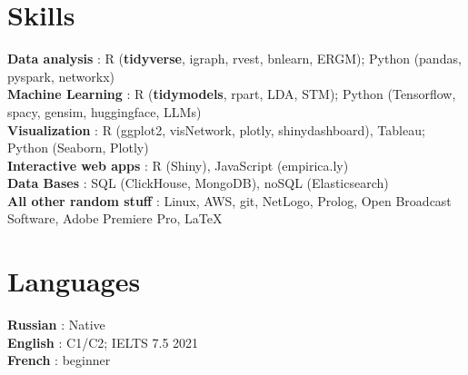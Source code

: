 \documentclass[letterpaper,11pt]{article}
\begin{document}
\section{Skills}
 \begin{itemize}[leftmargin=0in, label={}]
    \small{\item{
     \textbf{Data analysis} {: R (\textbf{tidyverse}, igraph, rvest, bnlearn, ERGM); Python (pandas, pyspark, networkx)} \vspace{2pt} \\
    \textbf{Machine Learning} {: R (\textbf{tidymodels}, rpart, LDA, STM); Python (Tensorflow, spacy, gensim, huggingface, LLMs)} \vspace{2pt} \\
    \textbf{Visualization} {: R (ggplot2, visNetwork, plotly, shinydashboard), Tableau;  Python (Seaborn, Plotly) } \vspace{2pt} \\
    \textbf{Interactive web apps} {: R (Shiny), JavaScript (empirica.ly)} \vspace{2pt} \\
    \textbf{Data Bases} {: SQL (ClickHouse, MongoDB), noSQL (Elasticsearch)} \vspace{2pt} \\
    \textbf{All other random stuff} {: Linux, AWS, git, NetLogo, Prolog, Open Broadcast Software, Adobe Premiere Pro, \LaTeX}
    }}
 \end{itemize}



\section{Languages}
 \begin{itemize}[leftmargin=0in, label={}]
    \small{\item{
     \textbf{Russian} {: Native} \vspace{2pt} \\
     \textbf{English} {: C1/C2; IELTS 7.5 2021} \vspace{2pt} \\
     \textbf{French} {: beginner} \vspace{2pt} \\
    }}
 \end{itemize}
\end{document}
